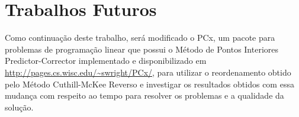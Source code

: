\section{Trabalhos Futuros}
Como continuação deste trabalho, será modificado o PCx, um pacote para
problemas de programação linear que possui o Método de Pontos Interiores
Predictor-Corrector implementado e disponibilizado em 
\url{http://pages.cs.wisc.edu/~swright/PCx/}, para utilizar o reordenamento
obtido pelo Método Cuthill-McKee Reverso e investigar os resultados obtidos com
essa mudança com respeito ao tempo para resolver os problemas e a qualidade da
solução.
